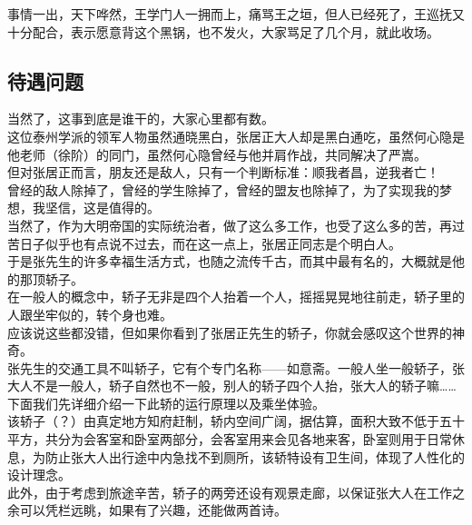 \begin{multicols}{\theparacolNo}
事情一出，天下哗然，王学门人一拥而上，痛骂王之垣，但人已经死了，王巡抚又十分配合，表示愿意背这个黑锅，也不发火，大家骂足了几个月，就此收场。\\

\subsection{待遇问题}
当然了，这事到底是谁干的，大家心里都有数。\\

这位泰州学派的领军人物虽然通晓黑白，张居正大人却是黑白通吃，虽然何心隐是他老师（徐阶）的同门，虽然何心隐曾经与他并肩作战，共同解决了严嵩。\\

但对张居正而言，朋友还是敌人，只有一个判断标准：顺我者昌，逆我者亡！\\

曾经的敌人除掉了，曾经的学生除掉了，曾经的盟友也除掉了，为了实现我的梦想，我坚信，这是值得的。\\

当然了，作为大明帝国的实际统治者，做了这么多工作，也受了这么多的苦，再过苦日子似乎也有点说不过去，而在这一点上，张居正同志是个明白人。\\

于是张先生的许多幸福生活方式，也随之流传千古，而其中最有名的，大概就是他的那顶轿子。\\

在一般人的概念中，轿子无非是四个人抬着一个人，摇摇晃晃地往前走，轿子里的人跟坐牢似的，转个身也难。\\

应该说这些都没错，但如果你看到了张居正先生的轿子，你就会感叹这个世界的神奇。\\

张先生的交通工具不叫轿子，它有个专门名称——如意斋。一般人坐一般轿子，张大人不是一般人，轿子自然也不一般，别人的轿子四个人抬，张大人的轿子嘛……\\

下面我们先详细介绍一下此轿的运行原理以及乘坐体验。\\

该轿子（？）由真定地方知府赶制，轿内空间广阔，据估算，面积大致不低于五十平方，共分为会客室和卧室两部分，会客室用来会见各地来客，卧室则用于日常休息，为防止张大人出行途中内急找不到厕所，该轿特设有卫生间，体现了人性化的设计理念。\\

此外，由于考虑到旅途辛苦，轿子的两旁还设有观景走廊，以保证张大人在工作之余可以凭栏远眺，如果有了兴趣，还能做两首诗。\\


\end{multicols}
